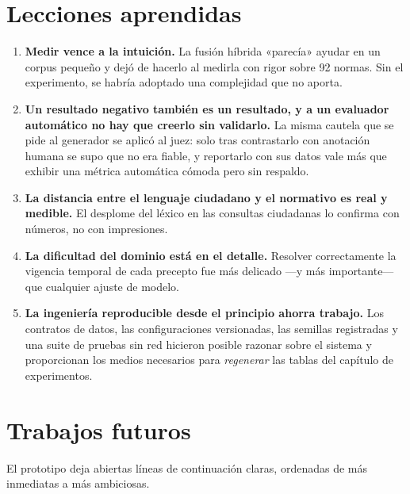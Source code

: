 \section{Lecciones aprendidas}
\label{sec:lecciones_aprendidas}

\begin{enumerate}
  \item \textbf{Medir vence a la intuición.} La fusión híbrida «parecía» ayudar en un corpus pequeño y dejó de hacerlo al medirla con rigor sobre 92 normas. Sin el experimento, se habría adoptado una complejidad que no aporta.
  \item \textbf{Un resultado negativo también es un resultado, y a un evaluador automático no hay que creerlo sin validarlo.} La misma cautela que se pide al generador se aplicó al juez: solo tras contrastarlo con anotación humana se supo que no era fiable, y reportarlo con sus datos vale más que exhibir una métrica automática cómoda pero sin respaldo.
  \item \textbf{La distancia entre el lenguaje ciudadano y el normativo es real y medible.} El desplome del léxico en las consultas ciudadanas lo confirma con números, no con impresiones.
  \item \textbf{La dificultad del dominio está en el detalle.} Resolver correctamente la vigencia temporal de cada precepto fue más delicado —y más importante— que cualquier ajuste de modelo.
  \item \textbf{La ingeniería reproducible desde el principio ahorra trabajo.} Los contratos de datos, las configuraciones versionadas, las semillas registradas y una suite de pruebas sin red hicieron posible razonar sobre el sistema y proporcionan los medios necesarios para \emph{regenerar} las tablas del capítulo de experimentos.
\end{enumerate}

\section{Trabajos futuros}
\label{sec:trabajos_futuros}

El prototipo deja abiertas líneas de continuación claras, ordenadas de más inmediatas a más ambiciosas.

